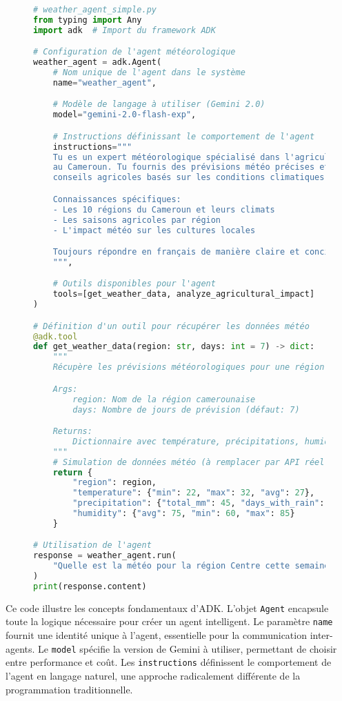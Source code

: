\begin{figure}[h]
\centering
\begin{lstlisting}[language=Python, caption=Agent météorologique simple avec ADK]
# weather_agent_simple.py
from typing import Any
import adk  # Import du framework ADK

# Configuration de l'agent météorologique
weather_agent = adk.Agent(
    # Nom unique de l'agent dans le système
    name="weather_agent",

    # Modèle de langage à utiliser (Gemini 2.0)
    model="gemini-2.0-flash-exp",

    # Instructions définissant le comportement de l'agent
    instructions="""
    Tu es un expert météorologique spécialisé dans l'agriculture
    au Cameroun. Tu fournis des prévisions météo précises et des
    conseils agricoles basés sur les conditions climatiques.

    Connaissances spécifiques:
    - Les 10 régions du Cameroun et leurs climats
    - Les saisons agricoles par région
    - L'impact météo sur les cultures locales

    Toujours répondre en français de manière claire et concise.
    """,

    # Outils disponibles pour l'agent
    tools=[get_weather_data, analyze_agricultural_impact]
)

# Définition d'un outil pour récupérer les données météo
@adk.tool
def get_weather_data(region: str, days: int = 7) -> dict:
    """
    Récupère les prévisions météorologiques pour une région.

    Args:
        region: Nom de la région camerounaise
        days: Nombre de jours de prévision (défaut: 7)

    Returns:
        Dictionnaire avec température, précipitations, humidité
    """
    # Simulation de données météo (à remplacer par API réelle)
    return {
        "region": region,
        "temperature": {"min": 22, "max": 32, "avg": 27},
        "precipitation": {"total_mm": 45, "days_with_rain": 3},
        "humidity": {"avg": 75, "min": 60, "max": 85}
    }

# Utilisation de l'agent
response = weather_agent.run(
    "Quelle est la météo pour la région Centre cette semaine?"
)
print(response.content)
\end{lstlisting}
\end{figure}

Ce code illustre les concepts fondamentaux d'ADK. L'objet \texttt{Agent} encapsule toute la logique nécessaire pour créer un agent intelligent. Le paramètre \texttt{name} fournit une identité unique à l'agent, essentielle pour la communication inter-agents. Le \texttt{model} spécifie la version de Gemini à utiliser, permettant de choisir entre performance et coût. Les \texttt{instructions} définissent le comportement de l'agent en langage naturel, une approche radicalement différente de la programmation traditionnelle.

